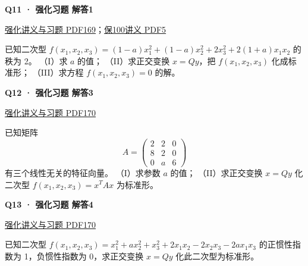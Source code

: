 \documentclass[UTF8,fontset=fandol,11pt,a4paper]{ctexart}
\newcommand{\source}[1]{{\footnotesize\color{Muted}#1\par}}
\newcommand{\qtitle}[2]{\par\needspace{5\baselineskip}\hypertarget{#1}{}\label{#1}\textbf{#2}\par}
\begin{document}
\begin{minipage}{\linewidth}
\qtitle{R-LONG-01}{Q11 · 强化习题 解答1}
\source{\href{file:///Users/skyintelligence/Desktop/\%E5\%BE\%97\%E8\%AF\%BB\%E4\%B8\%AA\%E7\%A0\%94-\%E5\%8C\%97\%E5\%A4\%A7\%E8\%BD\%AF\%E5\%BE\%AE/\%E6\%95\%B0\%E5\%AD\%A6\%20150/Kira\%C2\%B727\%E7\%BA\%BF\%E6\%80\%A7\%E4\%BB\%A3\%E6\%95\%B0\%E5\%BC\%BA\%E5\%8C\%96\%E8\%AE\%B2\%E4\%B9\%89\%2B\%E4\%B9\%A0\%E9\%A2\%98.pdf\#page=169}{强化讲义与习题 PDF169}；\href{file:///Users/skyintelligence/Desktop/\%E5\%BE\%97\%E8\%AF\%BB\%E4\%B8\%AA\%E7\%A0\%94-\%E5\%8C\%97\%E5\%A4\%A7\%E8\%BD\%AF\%E5\%BE\%AE/\%E6\%95\%B0\%E5\%AD\%A6\%20150/02\_\%E4\%B8\%93\%E9\%A1\%B9\%E5\%88\%B7\%E9\%A2\%98\_\%E4\%BF\%9D100/\%E7\%BA\%BF\%E6\%80\%A7\%E4\%BB\%A3\%E6\%95\%B0/\%E7\%BA\%BF\%E6\%80\%A7\%E4\%BB\%A3\%E6\%95\%B0\%E4\%B8\%93\%E9\%A1\%B9\%E5\%88\%B7\%E9\%A2\%98\%E8\%AF\%BE14-\%E4\%BA\%8C\%E6\%AC\%A1\%E5\%9E\%8B\%20\%E8\%AE\%B2\%E4\%B9\%89.pdf\#page=5}{保100讲义 PDF5}}
已知二次型 $f(x_1,x_2,x_3)=(1-a)x_1^2+(1-a)x_2^2+2x_3^2+2(1+a)x_1x_2$ 的秩为 2。
（I）求 $a$ 的值；
（II）求正交变换 $x=Qy$，把 $f(x_1,x_2,x_3)$ 化成标准形；
（III）求方程 $f(x_1,x_2,x_3)=0$ 的解。
\end{minipage}\par\vspace{7mm}
\begin{minipage}{\linewidth}
\qtitle{R-LONG-03}{Q12 · 强化习题 解答3}
\source{\href{file:///Users/skyintelligence/Desktop/\%E5\%BE\%97\%E8\%AF\%BB\%E4\%B8\%AA\%E7\%A0\%94-\%E5\%8C\%97\%E5\%A4\%A7\%E8\%BD\%AF\%E5\%BE\%AE/\%E6\%95\%B0\%E5\%AD\%A6\%20150/Kira\%C2\%B727\%E7\%BA\%BF\%E6\%80\%A7\%E4\%BB\%A3\%E6\%95\%B0\%E5\%BC\%BA\%E5\%8C\%96\%E8\%AE\%B2\%E4\%B9\%89\%2B\%E4\%B9\%A0\%E9\%A2\%98.pdf\#page=170}{强化讲义与习题 PDF170}}
已知矩阵
\[A=\begin{pmatrix}2&2&0\\8&2&0\\0&a&6\end{pmatrix}\]
有三个线性无关的特征向量。
（I）求参数 $a$ 的值；
（II）求正交变换 $x=Qy$ 化二次型 $f(x_1,x_2,x_3)=x^TAx$ 为标准形。
\end{minipage}\par\vspace{7mm}
\begin{minipage}{\linewidth}
\qtitle{R-LONG-04}{Q13 · 强化习题 解答4}
\source{\href{file:///Users/skyintelligence/Desktop/\%E5\%BE\%97\%E8\%AF\%BB\%E4\%B8\%AA\%E7\%A0\%94-\%E5\%8C\%97\%E5\%A4\%A7\%E8\%BD\%AF\%E5\%BE\%AE/\%E6\%95\%B0\%E5\%AD\%A6\%20150/Kira\%C2\%B727\%E7\%BA\%BF\%E6\%80\%A7\%E4\%BB\%A3\%E6\%95\%B0\%E5\%BC\%BA\%E5\%8C\%96\%E8\%AE\%B2\%E4\%B9\%89\%2B\%E4\%B9\%A0\%E9\%A2\%98.pdf\#page=170}{强化讲义与习题 PDF170}}
已知二次型 $f(x_1,x_2,x_3)=x_1^2+ax_2^2+x_3^2+2x_1x_2-2x_2x_3-2ax_1x_3$ 的正惯性指数为 1，负惯性指数为 0，求正交变换 $x=Qy$ 化此二次型为标准形。
\end{minipage}\par\vspace{7mm}
\end{document}

